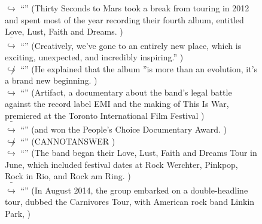 \documentclass[11pt,a4paper, onecolumn]{article}
\begin{document}
\begin{figure}[t] \small \begin{tcolorbox}[boxsep=0pt,left=5pt,right=0pt,top=2pt,colback = yellow!5] \begin{dialogue}
 \small 
\colorbox{pink!25}{$\hookrightarrow$}
{ ``'' (Thirty Seconds to Mars took a break from touring in 2012 and spent most of the year recording their fourth album, entitled Love, Lust, Faith and Dreams. ) }
\\
\colorbox{pink!25}{ $\bar{\hookrightarrow}$}
{ ``'' (Creatively, we've gone to an entirely new place, which is exciting, unexpected, and incredibly inspiring.'' ) }
\\
\colorbox{pink!25}{$\not\hookrightarrow$}
{ ``'' (He explained that the album ''is more than an evolution, it's a brand new beginning. ) }
\\
\colorbox{pink!25}{$\hookrightarrow$}
{ ``'' (Artifact, a documentary about the band's legal battle against the record label EMI and the making of This Is War, premiered at the Toronto International Film Festival ) }
\\
\colorbox{pink!25}{ $\bar{\hookrightarrow}$}
{ ``'' (and won the People's Choice Documentary Award. ) }
\\
\colorbox{pink!25}{$\not\hookrightarrow$}
{ ``'' (CANNOTANSWER ) }
\\
\colorbox{pink!25}{$\hookrightarrow$}
{ ``'' (The band began their Love, Lust, Faith and Dreams Tour in June, which included festival dates at Rock Werchter, Pinkpop, Rock in Rio, and Rock am Ring. ) }
\\
\colorbox{pink!25}{ $\bar{\hookrightarrow}$}
{ ``'' (In August 2014, the group embarked on a double-headline tour, dubbed the Carnivores Tour, with American rock band Linkin Park, ) }
\\
 \end{dialogue}\end{tcolorbox}\end{figure}
\end{document}
